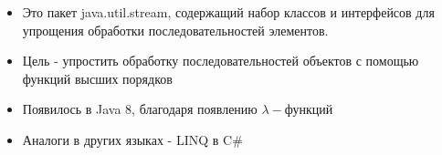 \begin{frame}
\frametitle{\insertsection} 
\framesubtitle{\insertsubsection}
\begin{itemize}
	\item Это пакет java.util.stream, содержащий набор классов и интерфейсов для упрощения обработки последовательностей элементов.
	\item Цель - упростить обработку последовательностей объектов с помощью функций высших порядков
	\item Появилось в Java 8, благодаря появлению $\lambda-$функций
	\item Аналоги в других языках - LINQ в C\#
\end{itemize}
\end{frame}